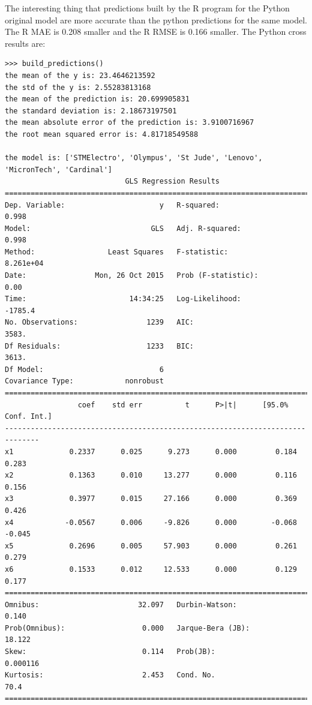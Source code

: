 \documentclass{article}
\begin{document}
The interesting thing that predictions built by the R program for the Python original model are more accurate than the python predictions for the same model. The R  MAE is 0.208 smaller and the R RMSE is 0.166 smaller.
The Python cross results are:
\begin{verbatim}
>>> build_predictions()
the mean of the y is: 23.4646213592
the std of the y is: 2.55283813168
the mean of the prediction is: 20.699905831
the standard deviation is: 2.18673197501
the mean absolute error of the prediction is: 3.9100716967
the root mean squared error is: 4.81718549588

the model is: ['STMElectro', 'Olympus', 'St Jude', 'Lenovo', 'MicronTech', 'Cardinal']
                            GLS Regression Results                            
==============================================================================
Dep. Variable:                      y   R-squared:                       0.998
Model:                            GLS   Adj. R-squared:                  0.998
Method:                 Least Squares   F-statistic:                 8.261e+04
Date:                Mon, 26 Oct 2015   Prob (F-statistic):               0.00
Time:                        14:34:25   Log-Likelihood:                -1785.4
No. Observations:                1239   AIC:                             3583.
Df Residuals:                    1233   BIC:                             3613.
Df Model:                           6                                         
Covariance Type:            nonrobust                                         
==============================================================================
                 coef    std err          t      P>|t|      [95.0% Conf. Int.]
------------------------------------------------------------------------------
x1             0.2337      0.025      9.273      0.000         0.184     0.283
x2             0.1363      0.010     13.277      0.000         0.116     0.156
x3             0.3977      0.015     27.166      0.000         0.369     0.426
x4            -0.0567      0.006     -9.826      0.000        -0.068    -0.045
x5             0.2696      0.005     57.903      0.000         0.261     0.279
x6             0.1533      0.012     12.533      0.000         0.129     0.177
==============================================================================
Omnibus:                       32.097   Durbin-Watson:                   0.140
Prob(Omnibus):                  0.000   Jarque-Bera (JB):               18.122
Skew:                           0.114   Prob(JB):                     0.000116
Kurtosis:                       2.453   Cond. No.                         70.4
==============================================================================
\end{verbatim}
\end{document}
